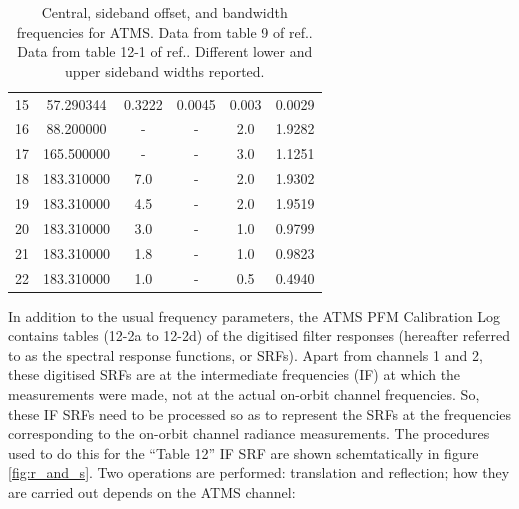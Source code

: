 \begin{table}[htp]
\begin{tabular}{c c c c c c}
           15        &  57.290344  & 0.3222 & 0.0045 & 0.003  & 0.0029        \\
           16        &  88.200000  & -      & -      & 2.0    & 1.9282        \\
           17        & 165.500000  & -      & -      & 3.0    & 1.1251        \\
           18        & 183.310000  & 7.0    & -      & 2.0    & 1.9302        \\
           19        & 183.310000  & 4.5    & -      & 2.0    & 1.9519        \\
           20        & 183.310000  & 3.0    & -      & 1.0    & 0.9799        \\
           21        & 183.310000  & 1.8    & -      & 1.0    & 0.9823        \\
           22        & 183.310000  & 1.0    & -      & 0.5    & 0.4940        \\
    \hline
  \end{tabular}
  \caption{Central, sideband offset, and bandwidth frequencies for ATMS. Data from table 9 of ref.\cite{CrIS_EDR_ATBD}. Data from table 12-1 of ref.\cite{ATMS_PFM_CalLog}. Different lower and upper sideband widths reported. }
  \label{tab:atms_fo_sb_and_df}
\end{table}

In addition to the usual frequency parameters, the ATMS PFM Calibration Log \cite{ATMS_PFM_CalLog} contains tables (12-2a to 12-2d) of the digitised filter responses (hereafter referred to as the spectral response functions, or SRFs). Apart from channels 1 and 2, these digitised SRFs are at the intermediate frequencies (IF) at which the measurements were made, not at the actual on-orbit channel frequencies. So, these IF SRFs need to be processed so as to represent the SRFs at the frequencies corresponding to the on-orbit channel radiance measurements. The procedures used to do this for the ``Table 12'' IF SRF are shown schemtatically in figure \ref{fig:r_and_s}. Two operations are performed: translation and reflection; how they are carried out depends on the ATMS channel:

